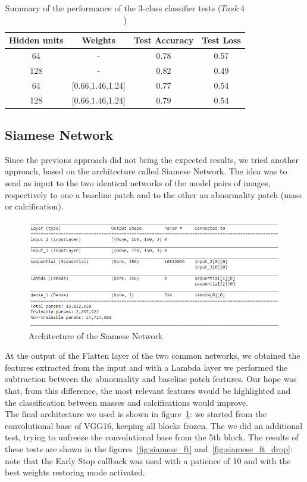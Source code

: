 \documentclass[11pt,a4paper,oneside]{article}
\begin{document}
\begin{table}[h]
\centering
	\begin{tabular}{|cc|cc|}
	\hline
	Hidden units & Weights & Test Accuracy & Test Loss \\
	\hline
	64  &	-    		   & 0.78 & 0.57 \\
	128 &	-  			   & 0.82 & 0.49 \\
	64  & [0.66,1.46,1.24] & 0.77 & 0.54 \\
	128 & [0.66,1.46,1.24] & 0.79 & 0.54 \\
	\hline
	\end{tabular}
\caption{Summary of the performance of the 3-class classifier tests ($Task\ 4$)}
\end{table}

\clearpage

\subsection{Siamese Network}
Since the previous approach did not bring the expected results, we tried another approach, based on the architecture called Siamese Network. The idea was to send as input to the two identical networks of the model pairs of images, respectively to one a baseline patch and to the other an abnormality patch (mass or calcification).

\begin{figure}[h]
\centering
\includegraphics[width=.5\textwidth]{images/4.1/Siamese/Model}
\caption{Architecture of the Siamese Network}
\label{fig:siamese_model}
\end{figure}

At the output of the Flatten layer of the two common networks, we obtained the features extracted from the input and with a Lambda layer we performed the subtraction between the abnormality and baseline patch features. Our hope was that, from this difference, the most relevant features would be highlighted and the classification between masses and calcifications would improve. \\
The final architecture we used is shown in figure~\ref{fig:siamese_model}: we started from the convolutional base of VGG16, keeping all blocks frozen. The we did an additional test, trying to unfreeze the convolutional base from the 5th block. The results of these tests are shown in the figures~\ref{fig:siamese_ft} and~\ref{fig:siamese_ft_drop}: note that the Early Stop callback was used with a patience of 10 and with the best weights restoring mode activated.
\end{document}
